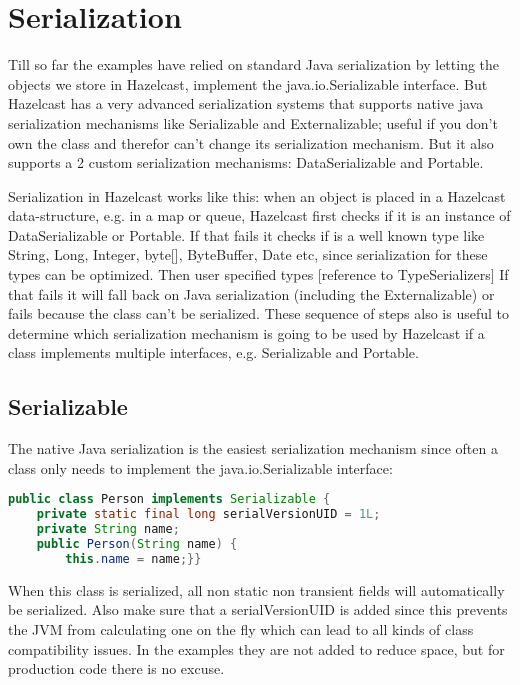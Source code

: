\chapter{Serialization}
Till so far the examples have relied on standard Java serialization by letting the objects we store in Hazelcast, implement the java.io.Serializable interface. But Hazelcast has a very advanced serialization systems that supports native java serialization mechanisms like Serializable and Externalizable;  useful if you don't own the class and therefor can't change its serialization mechanism. But it also supports a 2 custom serialization mechanisms: DataSerializable and Portable.

Serialization in Hazelcast works like this: when an object is placed in a Hazelcast data-structure, e.g. in a map or queue, Hazelcast first checks if it is an instance of DataSerializable or Portable. If that fails it checks if is a well known type like String, Long, Integer, byte[], ByteBuffer, Date etc, since serialization for these types can be optimized. Then user specified types [reference to TypeSerializers] If that fails it will fall back on Java serialization (including the Externalizable) or fails because the class can't be serialized. These sequence of steps also is useful to determine which serialization mechanism is going to be used by Hazelcast if a class implements multiple interfaces, e.g. Serializable and Portable.

\section{Serializable}
The native Java serialization is the easiest serialization mechanism since often a class only needs to implement the java.io.Serializable interface:
\begin{lstlisting}[language=java]
public class Person implements Serializable {
    private static final long serialVersionUID = 1L;
    private String name;
    public Person(String name) {
        this.name = name;}}
\end{lstlisting}
When this class is serialized, all non static non transient fields will automatically be serialized. Also make sure that a serialVersionUID is added since this prevents the JVM from calculating one on the fly which can lead to all kinds of class compatibility issues. In the examples they are not added to reduce space, but for production code there is no excuse.

